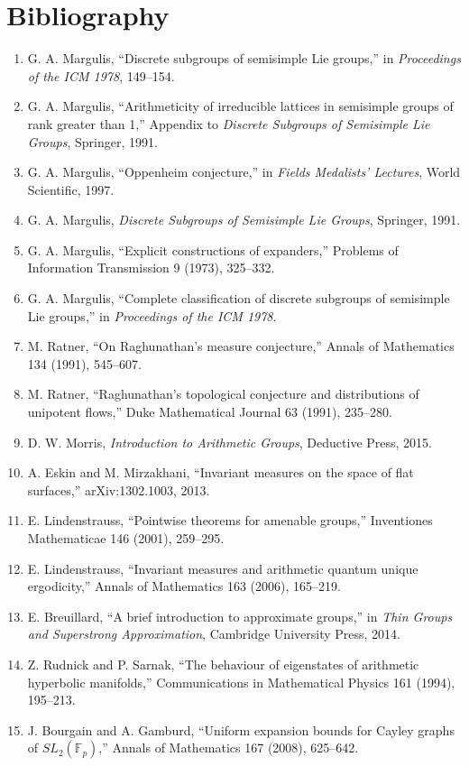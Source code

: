 \section*{Bibliography}
\begin{enumerate}
\item G. A. Margulis, ``Discrete subgroups of semisimple Lie groups,'' in \emph{Proceedings of the ICM 1978}, 149--154.
\item G. A. Margulis, ``Arithmeticity of irreducible lattices in semisimple groups of rank greater than 1,'' Appendix to \emph{Discrete Subgroups of Semisimple Lie Groups}, Springer, 1991.
\item G. A. Margulis, ``Oppenheim conjecture,'' in \emph{Fields Medalists' Lectures}, World Scientific, 1997.
\item G. A. Margulis, \emph{Discrete Subgroups of Semisimple Lie Groups}, Springer, 1991.
\item G. A. Margulis, ``Explicit constructions of expanders,'' Problems of Information Transmission 9 (1973), 325--332.
\item G. A. Margulis, ``Complete classification of discrete subgroups of semisimple Lie groups,'' in \emph{Proceedings of the ICM 1978}.
\item M. Ratner, ``On Raghunathan's measure conjecture,'' Annals of Mathematics 134 (1991), 545--607.
\item M. Ratner, ``Raghunathan's topological conjecture and distributions of unipotent flows,'' Duke Mathematical Journal 63 (1991), 235--280.
\item D. W. Morris, \emph{Introduction to Arithmetic Groups}, Deductive Press, 2015.
\item A. Eskin and M. Mirzakhani, ``Invariant measures on the space of flat surfaces,'' arXiv:1302.1003, 2013.
\item E. Lindenstrauss, ``Pointwise theorems for amenable groups,'' Inventiones Mathematicae 146 (2001), 259--295.
\item E. Lindenstrauss, ``Invariant measures and arithmetic quantum unique ergodicity,'' Annals of Mathematics 163 (2006), 165--219.
\item E. Breuillard, ``A brief introduction to approximate groups,'' in \emph{Thin Groups and Superstrong Approximation}, Cambridge University Press, 2014.
\item Z. Rudnick and P. Sarnak, ``The behaviour of eigenstates of arithmetic hyperbolic manifolds,'' Communications in Mathematical Physics 161 (1994), 195--213.
\item J. Bourgain and A. Gamburd, ``Uniform expansion bounds for Cayley graphs of $SL_2(\mathbb{F}_p)$,'' Annals of Mathematics 167 (2008), 625--642.

\end{enumerate}
